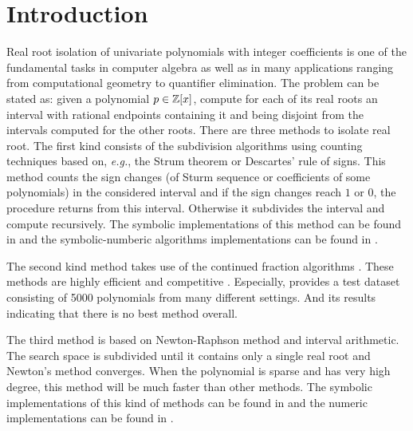 
\section{Introduction }
\label{}
Real root isolation of univariate polynomials with integer coefficients is one of the fundamental tasks in computer algebra as well as in many applications ranging from computational geometry to quantifier elimination. The problem can be stated as: given a polynomial $p\in {\mathbb Z}[x]$, compute for each of its real roots an interval with rational endpoints containing it and being disjoint from the intervals
computed for the other roots.  There are three methods to isolate real root.  The first kind consists of the subdivision algorithms using counting techniques based  on, {\it e.g.}, the Strum theorem or
Descartes' rule of signs.  This  method counts the sign changes (of Sturm sequence or coefficients of some polynomials) in the considered interval and if the sign changes reach $1$ or $0$, the procedure returns from this interval.
Otherwise it subdivides the interval and compute recursively. The symbolic implementations of this method can be found in \cite{collin76,rou04,kobel2016computing,Tsigaridas2016} and the symbolic-numberic algorithms implementations can be found in \cite{rou04,eig05,eig08,meh11}.

The second kind method takes use of the continued fraction algorithms \cite{akr08,tsi08,sha08}. These methods are highly efficient and competitive \cite{rou04,hemmer09}. Especially,  \cite{hemmer09} provides a test dataset   consisting of 5000 polynomials from many
different settings. And its   results indicating that there is no best method overall.

The third method is based on Newton-Raphson method and interval arithmetic.
The search space is subdivided until it contains only a single real root and Newton's method converges. When the polynomial is sparse and has very high degree, this method will be much faster than other methods. The symbolic implementations of this kind of methods can be found in \cite{xia06,xia07} and the numeric implementations
can be found in \cite{kla93,rump99}.

